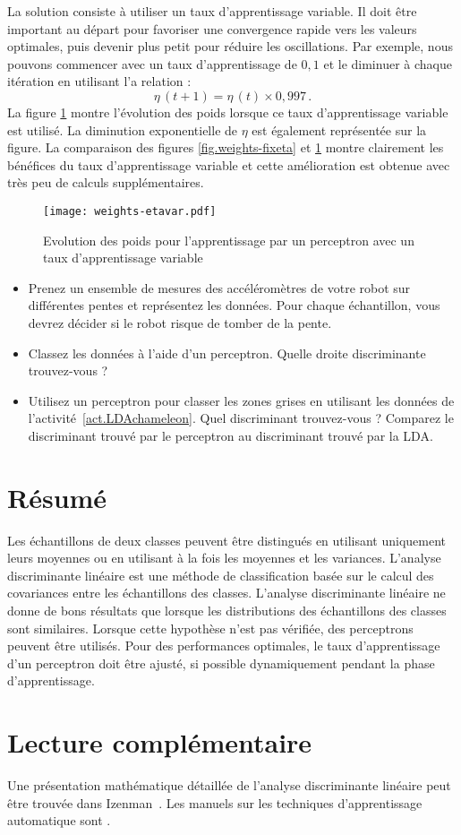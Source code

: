 La solution consiste à utiliser un taux d'apprentissage variable. Il doit être important au départ pour favoriser une convergence rapide vers les valeurs optimales, puis devenir plus petit pour réduire les oscillations. Par exemple, nous pouvons commencer avec un taux d'apprentissage de $0,1$ et le diminuer à chaque itération en utilisant l'a relation :
\[
\eta\,(t+1) = \eta\,(t) \times 0,997\,.
\]
La figure \ref{fig.perceptron-dis-etavar} montre l'évolution des poids lorsque ce taux d'apprentissage variable est utilisé. La diminution exponentielle de $\eta$ est également représentée sur la figure. La comparaison des figures \ref{fig.weights-fixeta} et \ref{fig.perceptron-dis-etavar} montre clairement les bénéfices du taux d'apprentissage variable et cette amélioration est obtenue avec très peu de calculs supplémentaires.
\begin{figure}
\begin{center}
\texttt{[image: weights-etavar.pdf]}
\end{center}
\caption{Evolution des poids pour l'apprentissage par un perceptron avec un taux d'apprentissage variable}\label{fig.perceptron-dis-etavar}
\end{figure}

\begin{framed}
\begin{itemize}
\item Prenez un ensemble de mesures des accéléromètres de votre robot sur différentes pentes et représentez les données. Pour chaque échantillon, vous devrez décider si le robot risque de tomber de la pente.
\item Classez les données à l'aide d'un perceptron. Quelle droite discriminante trouvez-vous ?
\item Utilisez un perceptron pour classer les zones grises en utilisant les données de l'activité~\ref{act.LDAchameleon}. Quel discriminant trouvez-vous ? Comparez le discriminant trouvé par le perceptron au discriminant trouvé par la LDA.
\end{itemize}
\end{framed}

\section{Résumé}

Les échantillons de deux classes peuvent être distingués en utilisant uniquement leurs moyennes ou en utilisant à la fois les moyennes et les variances. L'analyse discriminante linéaire est une méthode de classification basée sur le calcul des covariances entre les échantillons des classes. L'analyse discriminante linéaire ne donne de bons résultats que lorsque les distributions des échantillons des classes sont similaires. Lorsque cette hypothèse n’est pas vérifiée, des perceptrons peuvent être utilisés. Pour des performances optimales, le taux d'apprentissage d'un perceptron doit être ajusté, si possible dynamiquement pendant la phase d'apprentissage.

\section{Lecture complémentaire}

Une présentation mathématique détaillée de l'analyse discriminante linéaire peut être trouvée dans Izenman~\cite[Chapitre~8]{izenman2008}. Les manuels sur les techniques d'apprentissage automatique sont \cite{harrington2012machine, kubat2015machinelearning}.

